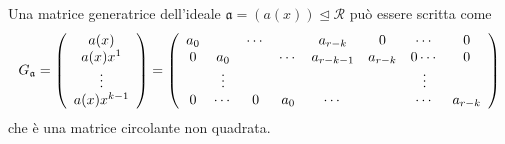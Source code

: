 \begin{corollario} \label{teo:matGenId}
   Una matrice generatrice dell'ideale $\mathfrak{a} = (a(x)) \unlhd \mathcal{R}$ può essere scritta come
   \begin{align*}
  G_{\mathfrak{a}}
  =
  \left(
  \begin{array} {c}
    a(x) \\
    a(x)x^{1} \\
    \vdots \\
    a(x)x^{k-1}
  \end{array}
  \right)
  =
  \left(
  \begin{array} {c c c c c c c c }
  a_{0} & & \cdots & & a_{r-k} & 0 & \cdots & 0   \\
  0 & a_{0} & & \cdots& a_{r-k - 1} & a_{r-k} & 0 \cdots & 0   \\
   & \vdots & &  &  &  & \vdots &    \\
  0 & \cdots & 0 & a_{0} &  \cdots &  & \cdots & a_{r-k}
  \end{array}
  \right)
  \end{align*}
  che è una matrice circolante non quadrata.
\end{corollario}

